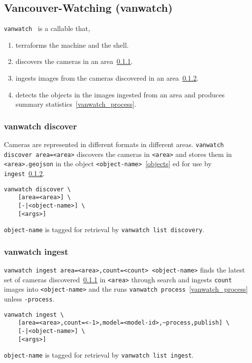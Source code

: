 \subsection{Vancouver-Watching (vanwatch)}
\label{vanwatch}

\texttt{vanwatch}~ is a callable that,
%
\begin{enumerate}
    \item{terraforms the machine and the shell.}
    \item{discovers the cameras in an area~\ref{vanwatch_discover}.}
    \item{ingests images from the cameras discovered in an area~\ref{vanwatch_ingest}.}
    \item{detects the objects in the images ingested from an area and produces summary statistics~\ref{vanwatch_process}.}
\end{enumerate}

\subsubsection{vanwatch discover}
\label{vanwatch_discover}

Cameras are represented in different formats in different areas. \texttt{vanwatch discover area=<area>} discovers the cameras in \texttt{<area>} and stores them in \texttt{<area>.geojson} in the object \texttt{<object-name>}~\ref{objects} ed for use by \texttt{ingest}~\ref{vanwatch_ingest}.
%
\begin{verbatim}
vanwatch discover \
    [area=<area>] \
    [-|<object-name>] \
    [<args>]
\end{verbatim}
%
\texttt{object-name} is tagged for retrieval by \texttt{vanwatch list discovery}. 

\subsubsection{vanwatch ingest}
\label{vanwatch_ingest}

\texttt{vanwatch ingest area=<area>,count=<count> <object-name>} finds the latest set of cameras discovered~\ref{vanwatch_discover} in \texttt{<area>} through  search and ingests \texttt{count} images into \texttt{<object-name>} and the runs \texttt{vanwatch process}~\ref{vanwatch_process} unless \texttt{-process}.
%
\begin{verbatim}
vanwatch ingest \
    [area=<area>,count=<-1>,model=<model-id>,~process,publish] \
    [-|<object-name>] \
    [<args>]
\end{verbatim}
%
\texttt{object-name} is tagged for retrieval by \texttt{vanwatch list ingest}. 

